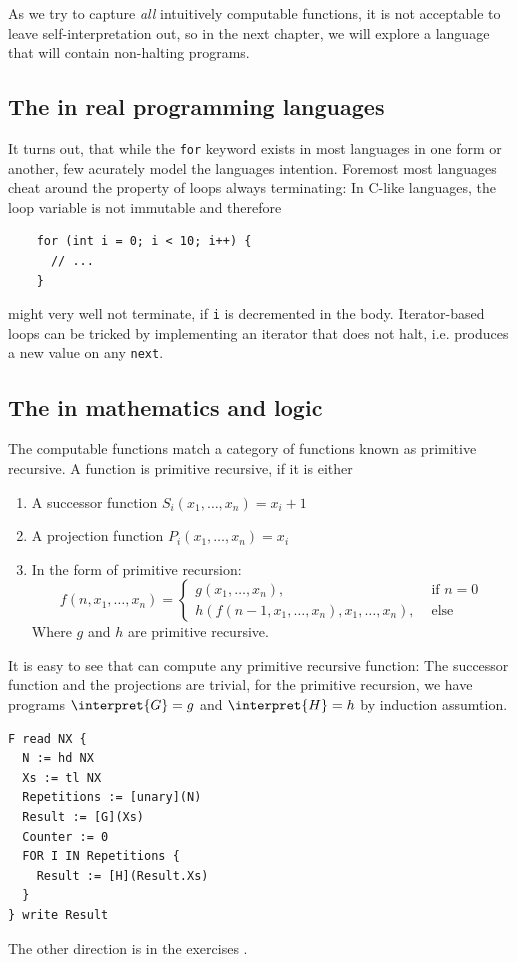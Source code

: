 As we try to capture {\em all} intuitively computable functions, it is not 
acceptable to leave self-interpretation out, so in the next chapter, we will 
explore a language that will contain non-halting programs.

\subsection{The \FOR in real programming languages}
It turns out, that while the {\tt for} keyword exists in most languages in 
one form or another, few acurately model the \FOR languages intention. 
Foremost most languages cheat around the property of \FOR loops always 
terminating: In C-like languages, the loop variable is not immutable and therefore
\begin{verbatim}
	for (int i = 0; i < 10; i++) {
	  // ...
	}
\end{verbatim}
might very well not terminate, if {\tt i} is decremented in the body. 
Iterator-based loops can be tricked by implementing an iterator that does not 
halt, i.e. produces a new value on any {\tt next}.

\subsection{The \FOR in mathematics and logic}
The \FOR computable functions match a category of functions known as 
primitive recursive. A function is primitive recursive, if it is either
\begin{enumerate}
	\item A successor function $S_i(x_1,\dots,x_n) = x_i+1$
	\item A projection function $P_i(x_1,\dots,x_n) = x_i$
	\item In the form of primitive recursion:
		\begin{equation*}
			f(n,x_1,\dots,x_n) = \begin{cases}
				g(x_1,\dots,x_n), &\text{ if }n=0\\
				h(f(n-1, x_1, \dots, x_n), x_1,\dots,x_n),&\text{ else}
			\end{cases}
		\end{equation*}
		Where $g$ and $h$ are primitive recursive.
\end{enumerate}
It is easy to see that \FOR can compute any primitive recursive function:
The successor function and the projections are trivial, for the primitive 
recursion, we have programs $\interpret{G}=g$ and $\interpret{H}=h$ by 
induction assumtion\citationneeded. 

\begin{verbatim}
F read NX {
  N := hd NX
  Xs := tl NX
  Repetitions := [unary](N)
  Result := [G](Xs)
  Counter := 0
  FOR I IN Repetitions {
    Result := [H](Result.Xs)
  }
} write Result
\end{verbatim}

The other direction is in the exercises \TODO.
